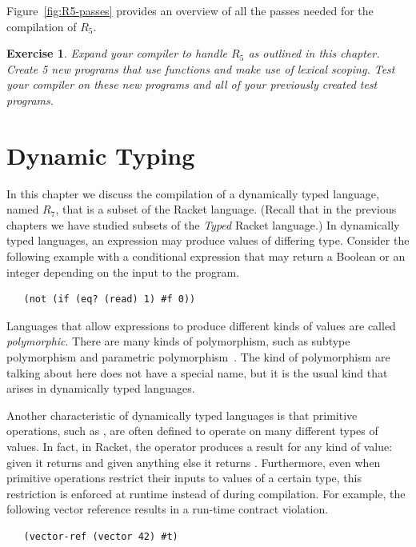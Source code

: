 \documentclass[11pt]{book}
\newtheorem{exercise}[theorem]{Exercise}
\begin{document}
Figure~\ref{fig:R5-passes} provides an overview of all the passes needed
for the compilation of $R_5$.

\begin{exercise}\normalfont
Expand your compiler to handle $R_5$ as outlined in this chapter.
Create 5 new programs that use  functions and make use of
lexical scoping. Test your compiler on these new programs and all of
your previously created test programs.
\end{exercise}


\chapter{Dynamic Typing}
\label{ch:type-dynamic}

In this chapter we discuss the compilation of a dynamically typed
language, named $R_7$, that is a subset of the Racket
language. (Recall that in the previous chapters we have studied
subsets of the \emph{Typed} Racket language.) In dynamically typed
languages, an expression may produce values of differing
type. Consider the following example with a conditional expression
that may return a Boolean or an integer depending on the input to the
program.
\begin{lstlisting}
   (not (if (eq? (read) 1) #f 0))
\end{lstlisting}
Languages that allow expressions to produce different kinds of values
are called \emph{polymorphic}. There are many kinds of polymorphism,
such as subtype polymorphism and parametric
polymorphism~\citep{Cardelli:1985kx}. The kind of polymorphism are
talking about here does not have a special name, but it is the usual
kind that arises in dynamically typed languages.

Another characteristic of dynamically typed languages is that
primitive operations, such as , are often defined to operate
on many different types of values. In fact, in Racket, the 
operator produces a result for any kind of value: given  it
returns  and given anything else it returns .
Furthermore, even when primitive operations restrict their inputs to
values of a certain type, this restriction is enforced at runtime
instead of during compilation. For example, the following vector
reference results in a run-time contract violation.
\begin{lstlisting}
   (vector-ref (vector 42) #t)
\end{lstlisting}
\end{document}
